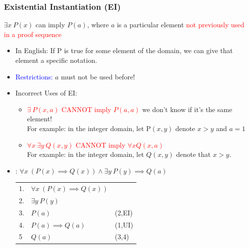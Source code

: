\documentclass[12pt, letterpaper]{article}
\newcommand{\cul}[1]{%
		\uline{\phantom{#1}}%
		\llap{\contour{white}{#1}}%
	}
\begin{document}
\pagebreak

\subsubsection*{Existential Instantiation (EI)}
$\exists x \ P(x)$ can imply $P(a)$, where $a$ is a particular element \textcolor{red}{not previously used in a proof sequence}
\begin{itemize}[label={}, leftmargin=0.3cm]
	\item In English: If P is true for some element of the domain, we can give that element a specific notation.
	\item \textcolor{blue}{Restrictions:} $a$ must not be used before!
	\item Incorrect Uses of EI:
	\begin{itemize}
		\item \textcolor{red}{$\exists \ P(x,a)$ CANNOT imply $P(a,a)$} {\tiny we don't know if it's the same element!} \\ For example: in the integer domain, let P$(x,y)$ denote $x > y$ and $a = 1$
		\item \textcolor{red}{$\forall x  \ \exists y \ Q(x,y)$ CANNOT imply $\forall x Q(x,a)$} \\ For example: in the integer domain, let $Q(x,y)$ denote that $x > y.$
	\end{itemize}
	\item \cul{Example}: $\forall x \ (P(x) \implies Q(x)) \land \exists y \ P(y) \implies Q(a)$
	\begin{center}
		\begin{tabular}{l l l}
			1. & $\forall x \ (P(x) \implies Q(x))$ & \\
			2. & $\exists y \ P(y)$ & \\
			3. & $P(a)$ & (2,EI) \\
			4. & $P(a) \implies Q(a)$ & (1,UI) \\
			5  & $Q(a)$ & (3,4)  
		\end{tabular}
	\end{center}
\end{itemize}


\pagebreak
\end{document}
